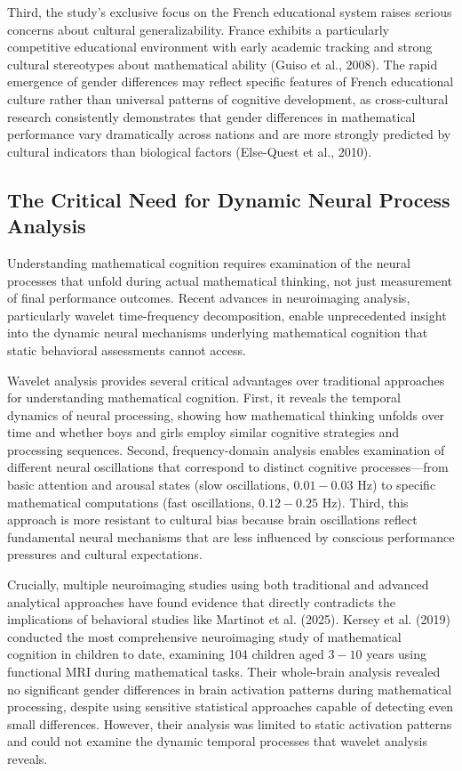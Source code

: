 \documentclass[pdflatex,reference]{sn-jnl}%
\theoremstyle{thmstyleone}%
\theoremstyle{thmstyletwo}%
\theoremstyle{thmstylethree}%
\begin{document}
Third, the study's exclusive focus on the French educational system raises serious concerns about cultural generalizability. France exhibits a particularly competitive educational environment with early academic tracking and strong cultural stereotypes about mathematical ability (Guiso et al., 2008). The rapid emergence of gender differences may reflect specific features of French educational culture rather than universal patterns of cognitive development, as cross-cultural research consistently demonstrates that gender differences in mathematical performance vary dramatically across nations and are more strongly predicted by cultural indicators than biological factors (Else-Quest et al., 2010).

\subsection{The Critical Need for Dynamic Neural Process Analysis}
Understanding mathematical cognition requires examination of the neural processes that unfold during actual mathematical thinking, not just measurement of final performance outcomes. Recent advances in neuroimaging analysis, particularly wavelet time-frequency decomposition, enable unprecedented insight into the dynamic neural mechanisms underlying mathematical cognition that static behavioral assessments cannot access.

Wavelet analysis provides several critical advantages over traditional approaches for understanding mathematical cognition. First, it reveals the temporal dynamics of neural processing, showing how mathematical thinking unfolds over time and whether boys and girls employ similar cognitive strategies and processing sequences. Second, frequency-domain analysis enables examination of different neural oscillations that correspond to distinct cognitive processes—from basic attention and arousal states (slow oscillations, $0.01-0.03$ Hz) to specific mathematical computations (fast oscillations, $0.12-0.25$ Hz). Third, this approach is more resistant to cultural bias because brain oscillations reflect fundamental neural mechanisms that are less influenced by conscious performance pressures and cultural expectations.

Crucially, multiple neuroimaging studies using both traditional and advanced analytical approaches have found evidence that directly contradicts the implications of behavioral studies like Martinot et al. (2025). Kersey et al. (2019) conducted the most comprehensive neuroimaging study of mathematical cognition in children to date, examining 104 children aged $3-10$ years using functional MRI during mathematical tasks. Their whole-brain analysis revealed no significant gender differences in brain activation patterns during mathematical processing, despite using sensitive statistical approaches capable of detecting even small differences. However, their analysis was limited to static activation patterns and could not examine the dynamic temporal processes that wavelet analysis reveals.
\end{document}
